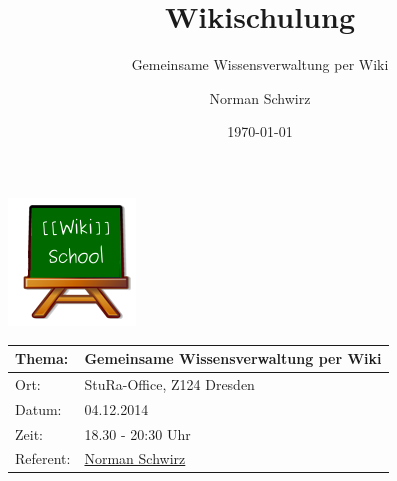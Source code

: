 \documentclass{beamer}
\title{Wikischulung}
\subtitle{Gemeinsame Wissensverwaltung per Wiki}
\author{Norman Schwirz}
\date{\today}
\begin{document}
\begin{frame} %

  \begin{center}
    \includegraphics[keepaspectratio=true, scale=1]{wikischool-logo}
    \begin{longtable}{|l|l|}
      \hline
       
       \textbf{Thema:}        &  \textbf{Gemeinsame Wissensverwaltung per Wiki}                 \\ 
      \hline
       
       Ort:                   &  StuRa-Office, Z124 Dresden                                      \\ 
      \hline
       
       Datum:                 &  04.12.2014                                                      \\ 
      \hline
       
       Zeit:                  &  18.30 - 20:30 Uhr                                               \\ 
      \hline
       
       Referent:              &  \href{http://www2.htw-dresden.de/~s70341/cgi-bin/dokuwiki/doku.php?id=user:norman}{Norman Schwirz}  \\ 
      \hline
       
    \end{longtable}
  \end{center}
\end{frame}


 
\end{document}
